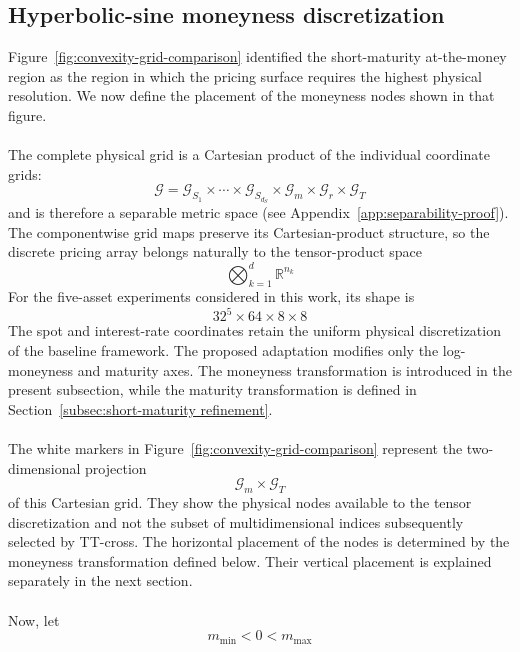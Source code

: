 \documentclass{article}
\numberwithin{equation}{subsection}
\theoremstyle{definition}
\theoremstyle{remark}
\begin{document}
\subsection{Hyperbolic-sine moneyness discretization}
Figure~\ref{fig:convexity-grid-comparison} identified the short-maturity at-the-money region as the region in which the pricing surface requires the highest physical resolution. We now define the placement of the moneyness nodes shown in that figure.\\
\\
The complete physical grid is a Cartesian product of the individual coordinate grids:
\begin{equation}
\mathcal{G}
=
\mathcal{G}_{S_1}
\times\cdots\times
\mathcal{G}_{S_{d_S}}
\times
\mathcal{G}_m
\times
\mathcal{G}_r
\times
\mathcal{G}_T
\end{equation}
and is therefore a separable metric space (see Appendix~\ref{app:separability-proof}). The componentwise grid maps preserve its Cartesian-product structure, so the discrete pricing array belongs naturally to the tensor-product space 
\[
\bigotimes_{k=1}^{d}\mathbb{R}^{n_k}
\]
For the five-asset experiments considered in this work, its shape is
\begin{equation}
32^5\times64\times8\times8
\end{equation}
The spot and interest-rate coordinates retain the uniform physical discretization of the baseline framework. The proposed adaptation modifies only the log-moneyness and maturity axes. The moneyness transformation is introduced in the present subsection, while the maturity transformation is defined in Section~\ref{subsec:short-maturity refinement}.\\
\\
The white markers in Figure~\ref{fig:convexity-grid-comparison} represent the two-dimensional projection
\begin{equation}
\mathcal{G}_m\times\mathcal{G}_T
\end{equation}
of this Cartesian grid. They show the physical nodes available to the tensor discretization and not the subset of multidimensional indices subsequently selected by TT-cross. The horizontal placement of the nodes is determined by the moneyness transformation defined below. Their vertical placement is explained separately in the next section.\\
\\
Now, let
\begin{equation}
m_{\min}<0<m_{\max}
\end{equation}
\end{document}
